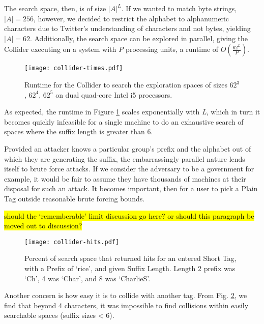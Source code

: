 The search space, then, is of size $|A|^L$. If we wanted to match byte strings, $|A| = 256$, however, we decided to restrict the alphabet to alphanumeric characters due to Twitter's understanding of characters and not bytes, yielding $|A| = 62$. Additionally, the search space can be explored in parallel, giving the Collider executing on a system with \textit{P} processing units, a runtime of $O(\frac{62^L}{P})$.


\begin{figure}
\begin{center}
\texttt{[image: collider-times.pdf]}
\caption{Runtime for the Collider to search the exploration spaces of sizes $62^3$, $62^4$, $62^5$ on dual quad-core Intel i5 processors.
\label{fig:collider-times}
}
\end{center}
\end{figure}

As expected, the runtime in Figure \ref{fig:collider-times} scales exponentially with \textit{L}, which in turn it becomes quickly infeasible for a single machine to do an exhaustive search of spaces where the suffix length is greater than 6.

Provided an attacker knows a particular group's prefix and the alphabet out of which they are generating the suffix, the embarrassingly parallel nature lends itself to brute force attacks. If we consider the adversary to be a government for example, it would be fair to assume they have thousands of machines at their disposal for such an attack. It becomes important, then for a user to pick a Plain Tag outside reasonable brute forcing bounds. 

\hl{should the `rememberable' limit discussion go here? or should this paragraph be moved out to discussion?}

\begin{figure}
\begin{center}
\texttt{[image: collider-hits.pdf]}
\caption{Percent of search space that returned hits for an entered Short Tag, with a Prefix of `rice', and given Suffix Length. Length 2 prefix was `Ch', 4 was `Char', and 8 was `CharlieS'.
\label{fig:collider-hits}
}
\end{center}
\end{figure}

Another concern is how easy it is to collide with another tag. From Fig. \ref{fig:collider-hits}, we find that beyond 4 characters, it was impossible to find collisions within easily searchable spaces (suffix sizes < 6). 

